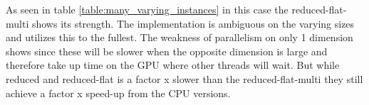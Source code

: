 
As seen in table \ref{table:many_varying_instances} in this case the reduced-flat-multi shows its strength. The implementation is ambiguous on the varying sizes and utilizes this to the fullest. The weakness of parallelism on only 1 dimension shows since these will be slower when the opposite dimension is large and therefore take up time on the GPU where other threads will wait. But while reduced and reduced-flat is a factor x slower than the reduced-flat-multi they still achieve a factor x speed-up from the CPU versions.
